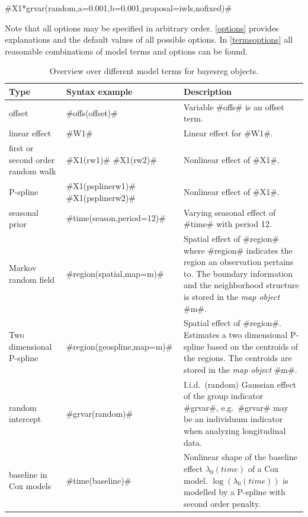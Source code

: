 #X1*grvar(random,a=0.001,b=0.001,proposal=iwls,nofixed)#

Note that all options may be specified in arbitrary order.
\autoref{options} provides explanations and the default values of
all possible options. In \autoref{termsoptions} all reasonable
combinations of model terms and options can be found.




\begin{table}[ht] \footnotesize
\begin{center}
\begin{tabular}{|p{2.8cm}|p{3.6cm}|p{7.1cm}|}
\hline
{\bf Type} & {\bf Syntax example} & {\bf Description} \\
\hline \hline
offset & #offs(offset)#  & Variable #offs# is an offset term. \\
\hline
linear effect & #W1#  & Linear effect for #W1#. \\
\hline
first or second order random walk &   #X1(rw1)#  \newline  #X1(rw2)#  & Nonlinear effect of #X1#. \\
\hline
P-spline &  #X1(psplinerw1)#   \newline  #X1(psplinerw2)#  & Nonlinear effect of #X1#.  \\
\hline
seasonal prior & #time(season,period=12)# & Varying seasonal effect of #time# with period 12. \\
\hline Markov random \newline field &  #region(spatial,map=m)#  &
Spatial effect of #region# where #region# indicates the region an
observation pertains to. The boundary information and the
neighborhood structure is stored in the {\em map object}
#m#. \\
\hline Two dimensional \newline P-spline &
#region(geospline,map=m)# & Spatial effect of #region#. Estimates
a two dimensional P-spline
based on the centroids of the regions. The centroids are stored in the {\em map object} #m#. \\
\hline random intercept &  #grvar(random)# & I.i.d.~(random)
Gaussian effect of the group indicator #grvar#,
e.g.~#grvar# may be an individuum indicator when analyzing longitudinal data.  \\
\hline baseline in Cox \newline models & #time(baseline)# &
Nonlinear shape
of the baseline effect $\lambda_0(time)$ of a Cox model. $\log(\lambda_0(time))$ is modelled by a P-spline with second order penalty. \\
\hline
\end{tabular}
{\em\caption {\label{terms} Overview over different model terms
for bayesreg objects.}}
\end{center}
\end{table}


